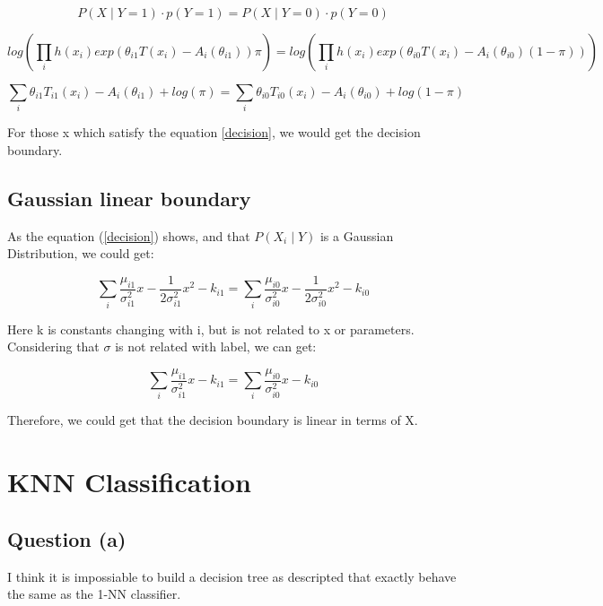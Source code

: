\documentclass{article} %
\begin{document}
\begin{equation}
P(X \mid Y= 1) \cdot p(Y=1) = P(X \mid Y = 0) \cdot p(Y=0)
\end{equation}

\begin{equation}
log (\prod_i h(x_i) exp(\theta_{i1} T(x_i) - A_i(\theta_{i1})) \pi)
= log (\prod_i h(x_i) exp(\theta_{i0} T(x_i) - A_i(\theta_{i0}) (1- \pi)))
\end{equation}

\begin{equation}
\label{decision}
\sum_i \theta_{i1} T_{i1}(x_i) - A_i(\theta_{i1}) + log(\pi) =
\sum_i \theta_{i0} T_{i0}(x_i) - A_i(\theta_{i0}) + log(1 - \pi)
\end{equation}

For those x which satisfy the equation \ref{decision}, we would get the decision
boundary.


\subsection{Gaussian linear boundary}

As the equation (\ref{decision}) shows, and that $P(X_i \mid Y)$ is a Gaussian
Distribution, we could get:

\begin{equation}
\sum_i \frac{\mu_{i1}}{\sigma_{i1}^2} x - \frac{1}{2 \sigma_{i1}^2} x^2 - k_{i1} =
\sum_i \frac{\mu_{i0}}{\sigma_{i0}^2} x - \frac{1}{2 \sigma_{i0}^2} x^2 - k_{i0}
\end{equation}

Here k is constants changing with i, but is not related to x or parameters.
Considering that $\sigma$ is not related with label, we can get:

\begin{equation}
\sum_i \frac{\mu_{i1}}{\sigma_{i1}^2} x - k_{i1} =
\sum_i \frac{\mu_{i0}}{\sigma_{i0}^2} x - k_{i0}
\end{equation}

Therefore, we could get that the decision boundary is linear in terms of X.



\section{KNN Classification}


\subsection{Question (a)}
I think it is impossiable to build a decision tree as descripted that exactly behave
the same as the 1-NN classifier.
\end{document}
